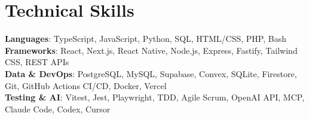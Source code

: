 \documentclass[letterpaper,11pt]{article}
\begin{document}
\section{Technical Skills}
\vspace{-7pt}
\begin{itemize}
[leftmargin=0.15in, label={}]\small{\item{
        \textbf{Languages}{: TypeScript, JavaScript, Python, SQL, HTML/CSS, PHP, Bash} \\
        \textbf{Frameworks}{: React, Next.js, React Native, Node.js, Express, Fastify, Tailwind CSS, REST APIs} \\
        \textbf{Data \& DevOps}{: PostgreSQL, MySQL, Supabase, Convex, SQLite, Firestore, Git, GitHub Actions CI/CD, Docker, Vercel} \\
        \textbf{Testing \& AI}{: Vitest, Jest, Playwright, TDD, Agile Scrum, OpenAI API, MCP, Claude Code, Codex, Cursor} \\
}}
\end{itemize}
\end{document}
